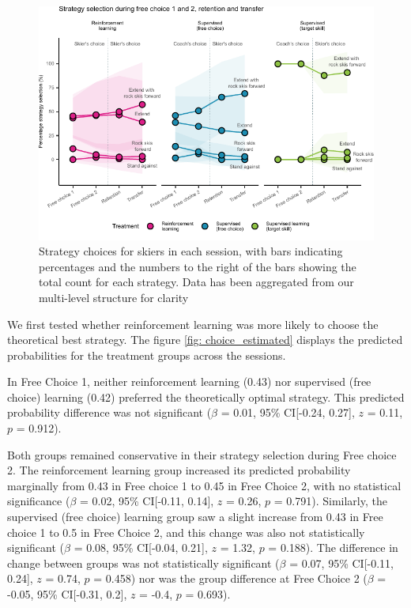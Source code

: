 \documentclass{article}
\begin{document}
\begin{figure}[H]
\centering
\includegraphics{figures/figure_choice_descriptivecount_4.pdf}
\caption{Strategy choices for skiers in each session, with bars indicating percentages and the numbers to the right of the bars showing the total count for
each strategy. Data has been aggregated from our multi-level structure for clarity}\label{fig: choice_descriptives}
\end{figure}


We first tested whether reinforcement learning was more likely to choose the theoretical best strategy. The figure \ref{fig: choice_estimated} displays the predicted probabilities for the treatment groups across the sessions. 

In Free Choice 1, neither reinforcement learning (0.43) nor supervised (free choice) learning (0.42) preferred the theoretically optimal strategy. This predicted probability difference was not significant ($\beta$ = 0.01, 95\% CI[-0.24, 0.27], $z$ = 0.11, $p$ = 0.912). 

Both groups remained conservative in their strategy selection during Free choice 2. The reinforcement learning group increased its predicted probability marginally from 0.43 in Free choice 1 to 0.45 in Free Choice 2, with no statistical significance ($\beta$ = 0.02, 95\% CI[-0.11, 0.14], $z$ = 0.26, $p$ = 0.791). Similarly, the supervised (free choice) learning group saw a slight increase from 0.43 in Free choice 1 to 0.5 in Free Choice 2, and this change was also not statistically significant ($\beta$ = 0.08, 95\% CI[-0.04, 0.21], $z$ = 1.32, $p$ = 0.188). The difference in change between groups was not statistically significant ($\beta$ = 0.07, 95\% CI[-0.11, 0.24], $z$ = 0.74, $p$ = 0.458) nor was the group difference at Free Choice 2 ($\beta$ = -0.05, 95\% CI[-0.31, 0.2], $z$ = -0.4, $p$ = 0.693). 
\end{document}
